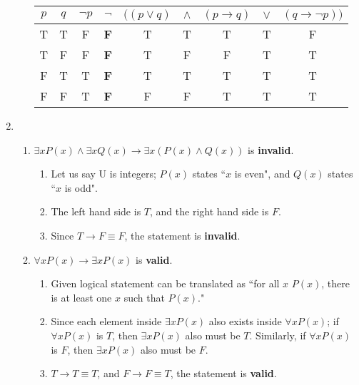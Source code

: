 \documentclass[12pt]{article}
\begin{document}
\begin{enumerate}
\begin{enumerate}
\begin{table}[H]
\begin{tabular}{|c|c|c|cccccc|}
    \hline 							
    \textbf{$p$} & \textbf{$q$} &  \textbf{$\neg p$} & \textbf{$ \neg $} & \textbf{$ ((p\lor q) $} & \textbf{$ \land $} & \textbf{$ (p \rightarrow q) $} & \textbf{$ \lor $} & \textbf{$ (q \rightarrow \neg p))  $}  \\
    \hline 
    \hline 
    T & T & F & \textbf{F} & T & T & T & T & F \\ \hline
    T & F & F & \textbf{F} & T & F & F & T & T \\ \hline
    F & T & T & \textbf{F} & T & T & T & T & T \\ \hline
    F & F & T & \textbf{F} & F & F & T & T & T \\ \hline
    \end{tabular}
    \end{table}
    \end{enumerate}
    \item
	\begin{enumerate}
	\item $ \exists xP(x) \land \exists xQ(x) \rightarrow \exists x(P(x) \land Q(x)) $ is \textbf{invalid}.
	\begin{enumerate}
	    \item Let us say U is integers; $P(x)$ states ``$x$ is even", and $Q(x)$ states ``$x$ is odd".
	    \item The left hand side is $T$, and the right hand side is $F$.
	    \item Since $T \rightarrow F \equiv F$, the statement is \textbf{invalid}.
	\end{enumerate} 
	\item $ \forall xP(x) \rightarrow \exists xP(x) $ is \textbf{valid}.
	\begin{enumerate}
	    \item Given logical statement can be translated as ``for all $x$ $P(x)$, there is at least one $x$ such that $P(x)$." 
	    \item Since each element inside $\exists xP(x)$ also exists inside $\forall xP(x)$; if $\forall xP(x)$ is $T$, then $\exists xP(x)$ also must be $T$. Similarly, if $\forall xP(x)$ is $F$, then $\exists xP(x)$ also must be $F$.
	    \item $T \rightarrow T \equiv T$, and $F \rightarrow F \equiv T$, the statement is \textbf{valid}.
	\end{enumerate}
	\end{enumerate}
\end{enumerate}
\end{document}
